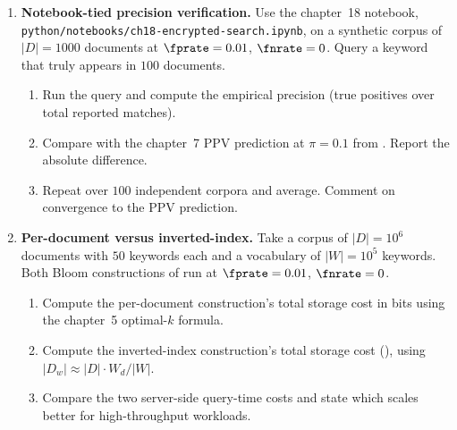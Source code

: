 \begin{enumerate}

\item \exstarstar
\label{ex:ch18-4}
\textbf{Notebook-tied precision verification.}
Use the chapter~18 notebook,
\texttt{python/notebooks/ch18-encrypted-search.ipynb}, on a
synthetic corpus of $|D| = 1000$ documents at $\fprate = 0.01$,
$\fnrate = 0$. Query a keyword that truly appears in $100$
documents.
\begin{enumerate}
  \item[(a)] Run the query and compute the empirical precision
    (true positives over total reported matches).
  \item[(b)] Compare with the chapter~7 PPV prediction at
    $\pi = 0.1$ from .
    Report the absolute difference.
  \item[(c)] Repeat over $100$ independent corpora and average.
    Comment on convergence to the PPV prediction.
\end{enumerate}

\item \exstarstar
\label{ex:ch18-5}
\textbf{Per-document versus inverted-index.}
Take a corpus of $|D| = 10^6$ documents with $50$ keywords each
and a vocabulary of $|W| = 10^5$ keywords. Both Bloom
constructions of  run at
$\fprate = 0.01$, $\fnrate = 0$.
\begin{enumerate}
  \item[(a)] Compute the per-document construction's total
    storage cost in bits using the chapter~5 optimal-$k$
    formula.
  \item[(b)] Compute the inverted-index construction's total
    storage cost (), using
    $|D_w| \approx |D| \cdot W_d / |W|$.
  \item[(c)] Compare the two server-side query-time costs and
    state which scales better for high-throughput workloads.
\end{enumerate}


\end{enumerate}
